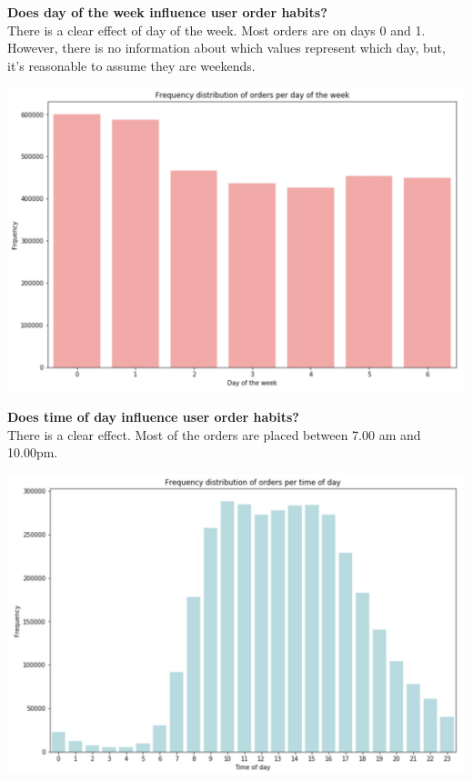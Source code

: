\documentclass[12pt]{article}
\begin{document}
\noindent
\textbf{Does day of the week influence user order habits?} \\
There is a clear effect of day of the week. Most orders are on days 0 and 1. However, there is no information about which values represent which day, but, it's reasonable to assume they are weekends.
\begin{center}
	\includegraphics[scale=0.2]{order_dow}
\end{center}

\noindent
\textbf{Does time of day influence user order habits?} \\
There is a clear effect. Most of the orders are placed between 7.00 am and 10.00pm.
\begin{center}
	\includegraphics[scale=0.2]{order_tod}
\end{center}
\end{document}
